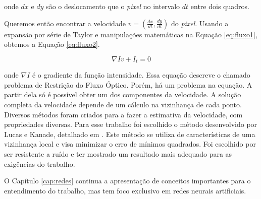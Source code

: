 onde $dx$ e $dy$ são o deslocamento que o \textit{pixel} no intervalo $dt$ entre dois quadros.

Queremos então encontrar a velocidade $v =(\frac{dx}{dt},\frac{dy}{dt})$ do \textit{pixel}. Usando a expansão por série de Taylor e manipulações matemáticas na Equação \ref{eq:fluxo1}, obtemos a Equação \ref{eq:fluxo2}\cite{faria1992fluxo}.

\begin{equation}
	\nabla Iv + I_t = 0
\label{eq:fluxo2}
\end{equation}

onde $\nabla I$ é o gradiente da função intensidade. Essa equação descreve o chamado problema de Restrição do Fluxo Óptico\cite{mota2011tensor}. Porém, há um problema na equação. A partir dela só é possível obter um dos componentes da velocidade. A solução completa da velocidade depende de um cálculo na vizinhança de cada ponto. Diversos métodos foram criados para a fazer a estimativa da velocidade, com propriedades diversas. Para esse trabalho foi escolhido o método desenvolvido por Lucas e Kanade, detalhado em \cite{bruhn2005lucas,faria1992fluxo,mota2011tensor}. Este método se utiliza de características de uma vizinhança local e visa minimizar o erro de mínimos quadrados. Foi escolhido por ser resistente a ruído e ter mostrado um resultado mais adequado para as exigências do trabalho.

O Capítulo \ref{cap:redes} continua a apresentação de conceitos importantes para o entendimento do trabalho, mas tem foco exclusivo em redes neurais artificiais. 






